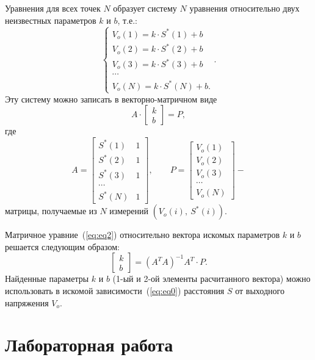 \documentclass[12pt]{article}
\begin{document}
Уравнения для всех точек \(N\) образует систему \(N\) уравнения относительно двух неизвестных параметров \(k\) и \(b\), т.е.:
\[
    \begin{cases}
        V_o(1)=k\cdot S^*(1)+b \\
        V_o(2)=k\cdot S^*(2)+b \\
        V_o(3)=k\cdot S^*(3)+b \\
        \cdots \\
        V_o(N)=k\cdot S^*(N)+b.
    \end{cases}.
\]
Эту систему можно записать в векторно-матричном виде
\begin{equation}
    A\cdot 
    \begin{bmatrix}
        k \\ b
    \end{bmatrix}
    =P,
    \label{eq:eq2}
\end{equation}
где
\[
    A=
    \begin{bmatrix}
        S^*(1) & 1 \\
        S^*(2) & 1 \\
        S^*(3) & 1 \\
        \cdots \\
        S^*(N) & 1
    \end{bmatrix},
    \qquad
    P=
    \begin{bmatrix}
        V_o(1) \\
        V_o(2) \\
        V_o(3) \\
        \cdots \\
        V_o(N)
    \end{bmatrix} - 
\]
матрицы, получаемые из \(N\) измерений \((V_o(i),\: S^*(i))\).

Матричное уравние~(\ref{eq:eq2}) относительно вектора искомых параметров \(k\) и \(b\) решается следующим образом:
\begin{equation}
    \begin{bmatrix}
        k \\ b
    \end{bmatrix}
    =\left(A^T A\right)^{-1}A^T \cdot P.
    \label{eq:eq3}
\end{equation}
Найденные параметры \(k\) и \(b\) (1-ый и 2-ой элементы расчитанного вектора) можно использовать в искомой зависимости~(\ref{eq:eq0}) расстояния \(S\) от выходного напряжения \(V_o\).

\section{Лабораторная работа}
\end{document}
